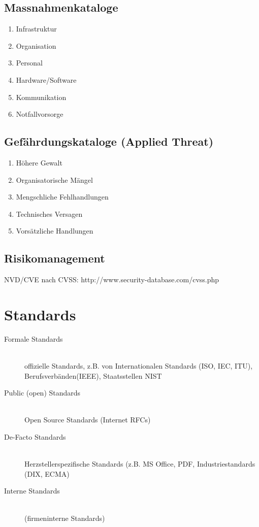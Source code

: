 \subsection{Massnahmenkataloge}
\begin{enumerate}
\item	Infrastruktur
\item	Organisation
\item	Personal
\item	Hardware/Software
\item	Kommunikation
\item	Notfallvorsorge
\end{enumerate}

\subsection{Gefährdungskataloge (Applied Threat)}
\begin{enumerate}
\item	Höhere Gewalt
\item	Organisatorische Mängel
\item	Mengschliche Fehlhandlungen
\item	Technisches Versagen
\item	Vorsätzliche Handlungen
\end{enumerate}

\subsection{Risikomanagement}

NVD/CVE nach CVSS:	http://www.security-database.com/cvss.php


\section{Standards}

\begin{description}
\item[Formale Standards] \hfill \\
	offizielle Standards, z.B. von Internationalen Standards (ISO, IEC, ITU), Berufsverbänden(IEEE), Staatsstellen NIST
\item[Public (open) Standards] \hfill \\
	Open Source Standards (Internet RFCs)
\item[De-Facto Standards] \hfill \\
	Herzstellerspezifische Standards (z.B. MS Office, PDF, Industriestandards (DIX, ECMA)
\item[Interne Standards] \hfill \\
	(firmeninterne Standards)
\end{description}
	
